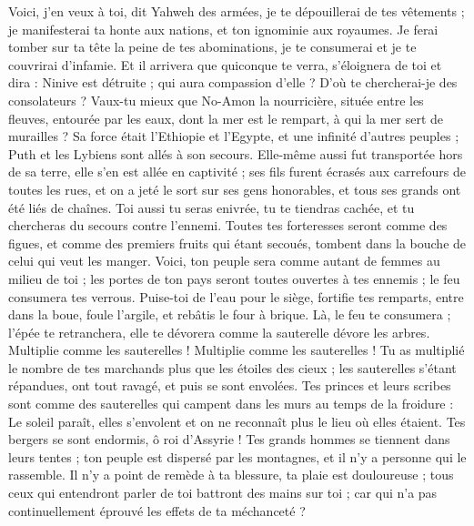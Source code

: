 \begin{multicols}{2}
Voici, j'en veux à toi, dit Yahweh des armées, je te dépouillerai de tes vêtements ; je manifesterai ta honte aux nations, et ton ignominie aux royaumes.
Je ferai tomber sur ta tête la peine de tes abominations, je te consumerai et je te couvrirai d'infamie.
Et il arrivera que quiconque te verra, s'éloignera de toi et dira : Ninive est détruite ; qui aura compassion d'elle ? D'où te chercherai-je des consolateurs ?
Vaux-tu mieux que No-Amon la nourricière, située entre les fleuves, entourée par les eaux, dont la mer est le rempart, à qui la mer sert de murailles ?
Sa force était l’Ethiopie et l'Egypte, et une infinité d'autres peuples ; Puth et les Lybiens sont allés à son secours.
Elle-même aussi fut transportée hors de sa terre, elle s'en est allée en captivité ; ses fils furent écrasés aux carrefours de toutes les rues, et on a jeté le sort sur ses gens honorables, et tous ses grands ont été liés de chaînes.
Toi aussi tu seras enivrée, tu te tiendras cachée, et tu chercheras du secours contre l'ennemi.
Toutes tes forteresses seront comme des figues, et comme des premiers fruits qui étant secoués, tombent dans la bouche de celui qui veut les manger.
Voici, ton peuple sera comme autant de femmes au milieu de toi ; les portes de ton pays seront toutes ouvertes à tes ennemis ; le feu consumera tes verrous.
Puise-toi de l'eau pour le siège, fortifie tes remparts, entre dans la boue, foule l'argile, et rebâtis le four à brique.
Là, le feu te consumera ; l'épée te retranchera, elle te dévorera comme la sauterelle dévore les arbres. Multiplie comme les sauterelles ! Multiplie comme les sauterelles !
Tu as multiplié le nombre de tes marchands plus que les étoiles des cieux ; les sauterelles s'étant répandues, ont tout ravagé, et puis se sont envolées.
Tes princes et leurs scribes sont comme des sauterelles qui campent dans les murs au temps de la froidure : Le soleil paraît, elles s’envolent et on ne reconnaît plus le lieu où elles étaient.
Tes bergers se sont endormis, ô roi d'Assyrie ! Tes grands hommes se tiennent dans leurs tentes ; ton peuple est dispersé par les montagnes, et il n'y a personne qui le rassemble.
Il n'y a point de remède à ta blessure, ta plaie est douloureuse ; tous ceux qui entendront parler de toi battront des mains sur toi ; car qui n'a pas continuellement éprouvé les effets de ta méchanceté ?
\PPE{}
\end{multicols}
